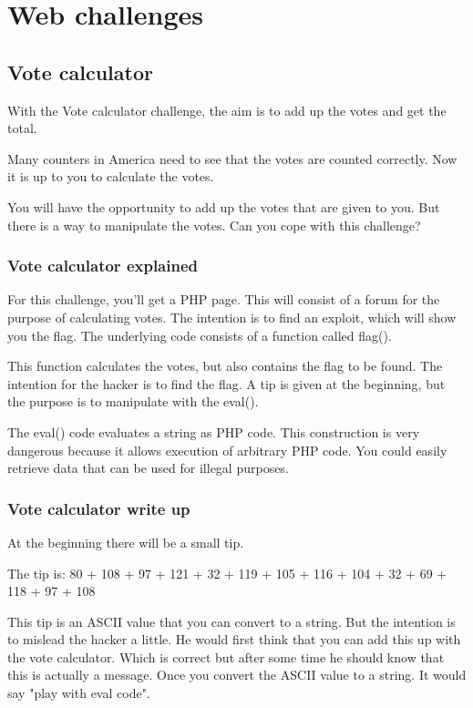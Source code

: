 \documentclass[../main.tex]{subfiles}
\begin{document}
\section{Web challenges}

\subsection{Vote calculator}
With the Vote calculator challenge, the aim is to add up the votes and get the total.

Many counters in America need to see that the votes are counted correctly. Now it is up to you to calculate the votes.

You will have the opportunity to add up the votes that are given to you. But there is a way to manipulate the votes. Can you cope with this challenge?

\subsubsection{Vote calculator explained}

For this challenge, you'll get a PHP page. This will consist of a forum for the purpose of calculating votes. The intention is to find an exploit, which will show you the flag. The underlying code consists of a function called flag(). 

This function calculates the votes, but also contains the flag to be found. The intention for the hacker is to find the flag. A tip is given at the beginning, but the purpose is to manipulate with the eval(). 

The eval() code evaluates a string as PHP code. This construction is very dangerous because it allows execution of arbitrary PHP code. You could easily retrieve data that can be used for illegal purposes.

\subsubsection{Vote calculator write up}

At the beginning there will be a small tip.

The tip is:
80 + 108 + 97 + 121 + 32 + 119 + 105 + 116 + 104 + 32 + 69 + 118 + 97 + 108 

This tip is an ASCII value that you can convert to a string. But the intention is to mislead the hacker a little. He would first think that you can add this up with the vote calculator. Which is correct but after some time he should know that this is actually a message. Once you convert the ASCII value to a string. It would say "play with eval code". 
\end{document}

